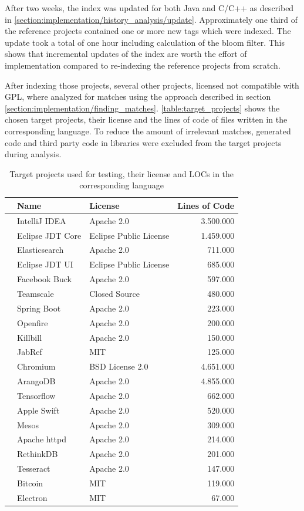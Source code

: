 After two weeks, the index was updated for both Java and C/C++ as described in \ref{section:implementation/history_analysis/update}.
Approximately one third of the reference projects contained one or more new tags which were indexed.
The update took a total of one hour including calculation of the bloom filter.
This shows that incremental updates of the index are worth the effort of implementation compared to re-indexing the reference projects from scratch.

After indexing those projects, several other projects, licensed not compatible with GPL, where analyzed for matches using the approach described in section \ref{section:implementation/finding_matches}.
\autoref{table:target_projects} shows the chosen target projects, their license and the lines of code of files written in the corresponding language.
To reduce the amount of irrelevant matches, generated code and third party code in libraries were excluded from the target projects during analysis.

\begin{table}[ht]
	\centering
	\begin{tabular}{l|llr}
		& \textbf{Name} & \textbf{License} & \textbf{Lines of Code} \\
		\hline 
		\parbox[t]{2mm}{} 
		& IntelliJ IDEA & Apache 2.0 & 3.500.000 \\
		& Eclipse JDT Core & Eclipse Public License & 1.459.000 \\
		& Elasticsearch & Apache 2.0 & 711.000 \\
		& Eclipse JDT UI & Eclipse Public License & 685.000 \\
		& Facebook Buck & Apache 2.0 & 597.000 \\
		& Teamscale & Closed Source & 480.000 \\
		& Spring Boot & Apache 2.0 & 223.000 \\
		& Openfire & Apache 2.0 & 200.000 \\
		& Killbill & Apache 2.0 & 150.000 \\
		& JabRef & MIT & 125.000 \\
		\hline 
		\parbox[t]{2mm}{} 
		& Chromium & BSD License 2.0 & 4.651.000 \\
		& ArangoDB & Apache 2.0 & 4.855.000 \\
		& Tensorflow & Apache 2.0 & 662.000 \\
		& Apple Swift & Apache 2.0 & 520.000 \\
		& Mesos & Apache 2.0 & 309.000 \\
		& Apache httpd & Apache 2.0 & 214.000 \\
		& RethinkDB & Apache 2.0 & 201.000 \\
		& Tesseract & Apache 2.0 & 147.000 \\
		& Bitcoin & MIT & 119.000 \\
		& Electron & MIT & 67.000 \\
	\end{tabular}
	\caption{Target projects used for testing, their license and LOCs in the corresponding language}\label{table:target_projects}
\end{table}

